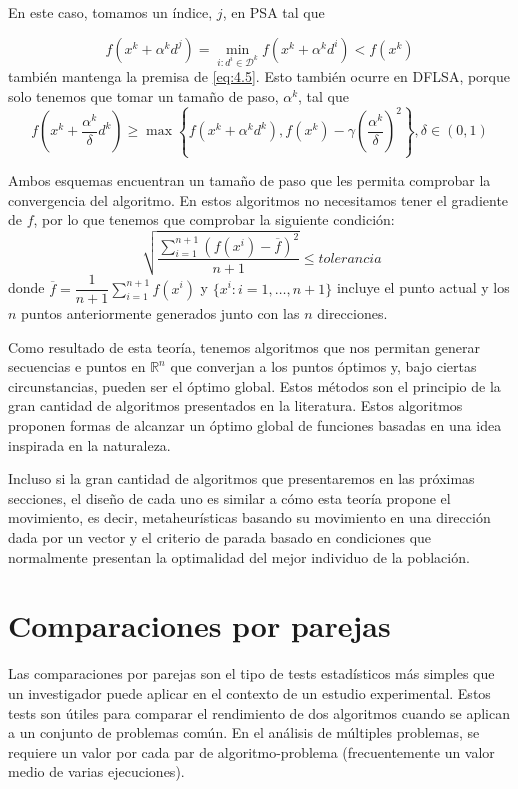 En este caso, tomamos un índice, $j$, en PSA tal que 

\begin{equation*}
f(x^k+\alpha^kd^j) = \min_{i:d^i\in\mathcal{D}^k} f(x^k+\alpha^kd^i) < f(x^k)
\end{equation*}
también mantenga la premisa de \ref{eq:4.5}. 
Esto también ocurre en DFLSA, porque solo tenemos que tomar un tamaño de paso, $\alpha^k$, tal que
\begin{equation*}
f\left(x^k+\dfrac{\alpha^k}{\delta}d^k\right) \geq \max\left\lbrace f(x^k+\alpha^kd^k), f(x^k)-\gamma\left(\dfrac{\alpha^k}{\delta}\right)^2\right\rbrace, \delta\in(0,1)
\end{equation*}

Ambos esquemas encuentran un tamaño de paso que les permita comprobar la convergencia del algoritmo. 
En estos algoritmos no necesitamos tener el gradiente de $f$, por lo que tenemos que comprobar la siguiente condición:
\begin{equation}
\sqrt[]{\dfrac{\sum_{i=1}^{n+1} (f(x^i)-\overline{f})^2}{n+1}} \leq tolerancia
\label{eq:4.33}
\end{equation}
donde $\overline{f} = \dfrac{1}{n+1}\sum_{i=1}^{n+1}f(x^i)$ y $\{x^i : i=1,\dots,n+1\}$ incluye el punto actual y los $n$ puntos anteriormente generados junto con las $n$ direcciones. 

Como resultado de esta teoría, tenemos algoritmos que nos permitan generar secuencias e puntos en $\mathbb{R}^n$ que converjan a los puntos óptimos y, bajo ciertas circunstancias, pueden ser el óptimo global. 
Estos métodos son el principio de la gran cantidad de algoritmos presentados en la literatura. 
Estos algoritmos proponen formas de alcanzar un óptimo global  de funciones basadas en una idea inspirada en la naturaleza. 

Incluso si la gran cantidad de algoritmos que presentaremos en las próximas secciones, el diseño de cada uno es similar a cómo esta teoría propone el movimiento, es decir, metaheurísticas basando su movimiento en una dirección dada por un vector y el criterio de parada basado en condiciones que normalmente presentan la optimalidad del mejor individuo de la población.

\section{Comparaciones por parejas}

Las comparaciones por parejas son el tipo de tests estadísticos más simples que un investigador puede aplicar en el contexto de un estudio experimental. 
Estos tests son útiles para comparar el rendimiento de dos algoritmos cuando se aplican a un conjunto de problemas común. 
En el análisis de múltiples problemas, se requiere un valor por cada par de algoritmo-problema (frecuentemente un valor medio de varias ejecuciones). 


